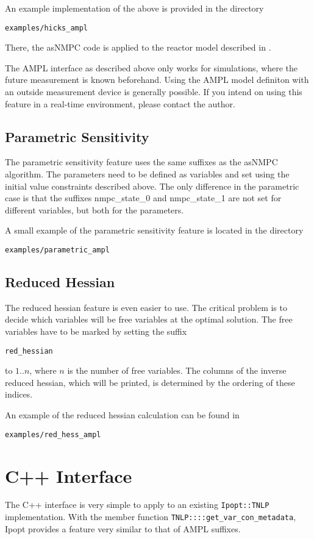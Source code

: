 \documentclass[a4paper]{article}
\begin{document}
An example implementation of the above is provided in the directory 
\begin{verbatim}
examples/hicks_ampl
\end{verbatim} 
There, the asNMPC code is applied to the reactor model described in \cite{Hicks1971}.

The AMPL interface as described above only works for simulations, where the future measurement is known beforehand. Using the AMPL model definiton with an outside measurement device is generally possible. If you intend on using this feature in a real-time environment, please contact the author.
\subsection{Parametric Sensitivity}
The parametric sensitivity feature uses the same suffixes as the asNMPC algorithm. The parameters need to be defined as variables and set using the initial value constraints described above. The only difference in the parametric case is that the suffixes nmpc\_state\_0 and nmpc\_state\_1 are not set for different variables, but both for the parameters.

A small example of the parametric sensitivity feature is located in the directory
\begin{verbatim}
examples/parametric_ampl
\end{verbatim}
\subsection{Reduced Hessian}
The reduced hessian feature is even easier to use. The critical problem is to decide which variables will be free variables at the optimal solution. The free variables have to be marked by setting the suffix
\begin{verbatim}
red_hessian
\end{verbatim}
to $1..n$, where $n$ is the number of free variables. The columns of the inverse reduced hessian, which will be printed, is determined by the ordering of these indices.

An example of the reduced hessian calculation can be found in 
\begin{verbatim}
examples/red_hess_ampl
\end{verbatim}
\section{C++ Interface}
The C++ interface is very simple to apply to an existing {\tt Ipopt::TNLP} implementation. With the member function {\tt TNLP::::get\_var\_con\_metadata}, Ipopt provides a feature very similar to that of AMPL suffixes. 
\end{document}
